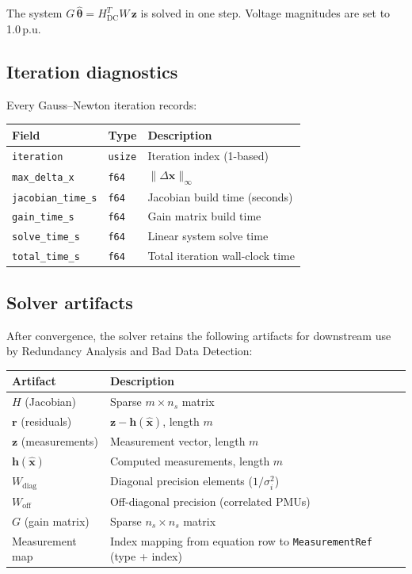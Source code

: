 \documentclass[11pt,a4paper]{article}
\begin{document}
\noindent
The system $G\,\hat{\bm{\theta}} = H_\text{DC}^T W\,\mathbf{z}$ is solved
in one step.  Voltage magnitudes are set to 1.0\,p.u.

\subsection{Iteration diagnostics}

Every Gauss--Newton iteration records:

\begin{center}
\small
\begin{tabular}{llp{55mm}}
  \toprule
  \textbf{Field} & \textbf{Type} & \textbf{Description} \\
  \midrule
  \texttt{iteration}        & \texttt{usize} & Iteration index (1-based) \\
  \texttt{max\_delta\_x}    & \texttt{f64}   & $\|\Delta\mathbf{x}\|_\infty$ \\
  \texttt{jacobian\_time\_s}  & \texttt{f64}   & Jacobian build time (seconds) \\
  \texttt{gain\_time\_s}      & \texttt{f64}   & Gain matrix build time \\
  \texttt{solve\_time\_s}     & \texttt{f64}   & Linear system solve time \\
  \texttt{total\_time\_s}     & \texttt{f64}   & Total iteration wall-clock time \\
  \bottomrule
\end{tabular}
\end{center}

\subsection{Solver artifacts}\label{sec:artifacts}

After convergence, the solver retains the following artifacts for
downstream use by Redundancy Analysis and Bad Data Detection:

\begin{center}
\small
\begin{tabular}{lp{65mm}}
  \toprule
  \textbf{Artifact} & \textbf{Description} \\
  \midrule
  $H$ (Jacobian)         & Sparse $m \times n_s$ matrix \\
  $\mathbf{r}$ (residuals) & $\mathbf{z} - \mathbf{h}(\hat{\mathbf{x}})$,
    length $m$ \\
  $\mathbf{z}$ (measurements) & Measurement vector, length $m$ \\
  $\mathbf{h}(\hat{\mathbf{x}})$ & Computed measurements, length $m$ \\
  $W_\text{diag}$        & Diagonal precision elements ($1/\sigma_i^2$) \\
  $W_\text{off}$         & Off-diagonal precision (correlated PMUs) \\
  $G$ (gain matrix)      & Sparse $n_s \times n_s$ matrix \\
  Measurement map        & Index mapping from equation row to
    \texttt{MeasurementRef} (type + index) \\
  \bottomrule
\end{tabular}
\end{center}
\end{document}
